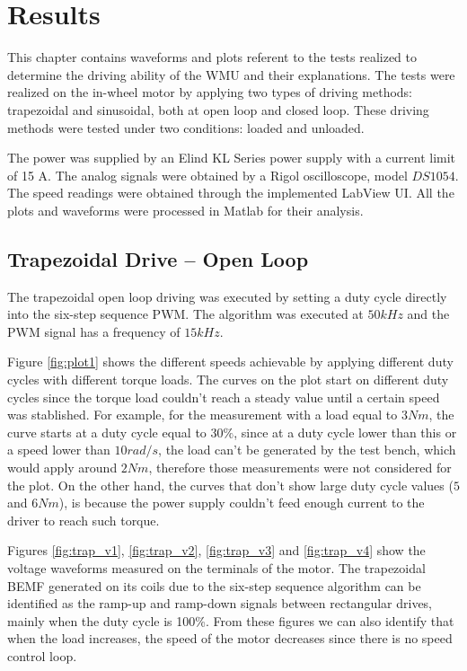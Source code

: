 \chapter{Results} \label{chap:results}

This chapter contains waveforms and plots referent to the tests realized to determine the driving ability of the \ac{WMU} and their explanations. The tests were realized on the in-wheel motor by applying two types of driving methods: trapezoidal and sinusoidal, both at open loop and closed loop. These driving methods were tested under two conditions: loaded and unloaded. 

The power was supplied by an Elind KL Series power supply with a current limit of 15 A. The analog signals were obtained by a Rigol oscilloscope, model $DS1054$. The speed readings were obtained through the implemented LabView \ac{UI}. All the plots and waveforms were processed in Matlab for their analysis.

\section{Trapezoidal Drive -- Open Loop}

The trapezoidal open loop driving was executed by setting a duty cycle directly into the six-step sequence \ac{PWM}. The algorithm was executed at $50kHz$ and the \ac{PWM} signal has a frequency of $15kHz$.

Figure \ref{fig:plot1} shows the different speeds achievable by applying different duty cycles with different torque loads. The curves on the plot start on different duty cycles since the torque load couldn’t reach a steady value until a certain speed was stablished. For example, for the measurement with a load equal to $3 Nm$, the curve starts at a duty cycle equal to $30\%$, since at a duty cycle lower than this or a speed lower than $10 rad/s$, the load can’t be generated by the test bench, which would apply around $2 Nm$, therefore those measurements were not considered for the plot. On the other hand, the curves that don’t show large duty cycle values ($5$ and $6 Nm$), is because the power supply couldn’t feed enough current to the driver to reach such torque.

Figures \ref{fig:trap_v1}, \ref{fig:trap_v2}, \ref{fig:trap_v3} and \ref{fig:trap_v4} show the voltage waveforms measured on the terminals of the motor. The trapezoidal \ac{BEMF} generated on its coils due to the six-step sequence algorithm can be identified as the ramp-up and ramp-down signals between rectangular drives, mainly when the duty cycle is 100\%. From these figures we can also identify that when the load increases, the speed of the motor decreases since there is no speed control loop.

